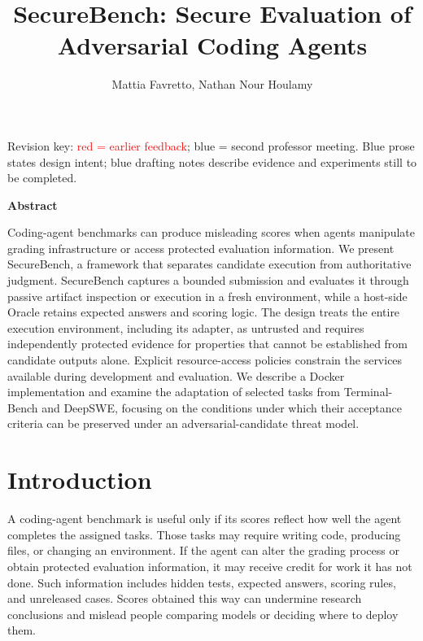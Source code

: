 \documentclass[conference]{IEEEtran}
\title{SecureBench: Secure Evaluation of Adversarial Coding Agents}
\author{Mattia Favretto, Nathan Nour Houlamy}
\renewenvironment{abstract}{%
    \normalfont\small
    \begin{center}\bfseries Abstract\end{center}
    \noindent\ignorespaces
}{\par\medskip}
\newcommand{\draft}[1]{%
    \par\noindent
    {\color{gray}\small #1}
    \par
}
\newcommand{\teacher}[1]{\textcolor{red}{#1}}
\newcommand{\secondtalk}[1]{{\color{secondtalkblue}#1}}
\begin{document}
\maketitle

\draft{Revision key: \teacher{red = earlier feedback};
\secondtalk{blue = second professor meeting. Blue prose states design intent;
blue drafting notes describe evidence and experiments still to be completed.}}



\begin{abstract}

Coding-agent benchmarks can produce misleading scores when agents manipulate grading infrastructure or access protected evaluation information. We present SecureBench, a framework that separates candidate execution from authoritative judgment. SecureBench captures a bounded submission and evaluates it through passive artifact inspection or execution in a fresh environment, while a host-side Oracle retains expected answers and scoring logic. The design treats the entire execution environment, including its adapter, as untrusted and requires independently protected evidence for properties that cannot be established from candidate outputs alone. Explicit resource-access policies constrain the services available during development and evaluation. We describe a Docker implementation and examine the adaptation of selected tasks from Terminal-Bench and DeepSWE, focusing on the conditions under which their acceptance criteria can be preserved under an adversarial-candidate threat model.

\end{abstract}



\section{Introduction}

A coding-agent benchmark is useful only if its scores reflect how well the agent completes the assigned tasks. Those tasks may require writing code, producing files, or changing an environment. If the agent can alter the grading process or obtain protected evaluation information, it may receive credit for work it has not done. Such information includes hidden tests, expected answers, scoring rules, and unreleased cases. Scores obtained this way can undermine research conclusions and mislead people comparing models or deciding where to deploy them.
\end{document}
